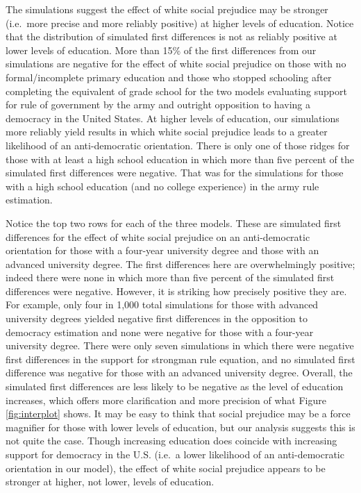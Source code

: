 \documentclass[11pt,]{article}
\begin{document}
The simulations suggest the effect of white social prejudice may be
stronger (i.e.~more precise and more reliably positive) at higher levels
of education. Notice that the distribution of simulated first
differences is not as reliably positive at lower levels of education.
More than 15\% of the first differences from our simulations are
negative for the effect of white social prejudice on those with no
formal/incomplete primary education and those who stopped schooling
after completing the equivalent of grade school for the two models
evaluating support for rule of government by the army and outright
opposition to having a democracy in the United States. At higher levels
of education, our simulations more reliably yield results in which white
social prejudice leads to a greater likelihood of an anti-democratic
orientation. There is only one of those ridges for those with at least a
high school education in which more than five percent of the simulated
first differences were negative. That was for the simulations for those
with a high school education (and no college experience) in the army
rule estimation.

Notice the top two rows for each of the three models. These are
simulated first differences for the effect of white social prejudice on
an anti-democratic orientation for those with a four-year university
degree and those with an advanced university degree. The first
differences here are overwhelmingly positive; indeed there were none in
which more than five percent of the simulated first differences were
negative. However, it is striking how precisely positive they are. For
example, only four in 1,000 total simulations for those with advanced
university degrees yielded negative first differences in the opposition
to democracy estimation and none were negative for those with a
four-year university degree. There were only seven simulations in which
there were negative first differences in the support for strongman rule
equation, and no simulated first difference was negative for those with
an advanced university degree. Overall, the simulated first differences
are less likely to be negative as the level of education increases,
which offers more clarification and more precision of what Figure
\ref{fig:interplot} shows. It may be easy to think that social prejudice
may be a force magnifier for those with lower levels of education, but
our analysis suggests this is not quite the case. Though increasing
education does coincide with increasing support for democracy in the
U.S. (i.e.~a lower likelihood of an anti-democratic orientation in our
model), the effect of white social prejudice appears to be stronger at
higher, not lower, levels of education.
\end{document}
